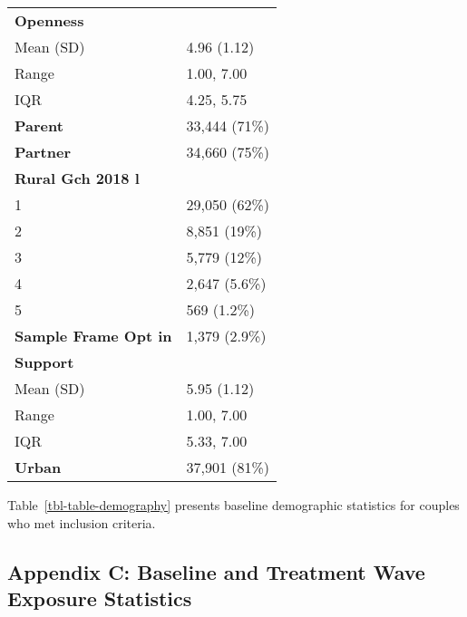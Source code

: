 \documentclass[
  singlecolumn]{article}
\begin{document}
\begin{longtable}[]{@{}ll@{}}
\textbf{Openness} & \\
Mean (SD) & 4.96 (1.12) \\
Range & 1.00, 7.00 \\
IQR & 4.25, 5.75 \\
\textbf{Parent} & 33,444 (71\%) \\
\textbf{Partner} & 34,660 (75\%) \\
\textbf{Rural Gch 2018 l} & \\
1 & 29,050 (62\%) \\
2 & 8,851 (19\%) \\
3 & 5,779 (12\%) \\
4 & 2,647 (5.6\%) \\
5 & 569 (1.2\%) \\
\textbf{Sample Frame Opt in} & 1,379 (2.9\%) \\
\textbf{Support} & \\
Mean (SD) & 5.95 (1.12) \\
Range & 1.00, 7.00 \\
IQR & 5.33, 7.00 \\
\textbf{Urban} & 37,901 (81\%) \\
\end{longtable}

Table~\ref{tbl-table-demography} presents baseline demographic
statistics for couples who met inclusion criteria.

\subsection{Appendix C: Baseline and Treatment Wave Exposure
Statistics}\label{appendix-exposures}
\end{document}
